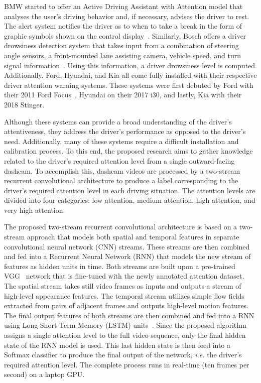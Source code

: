 BMW started to offer an Active Driving Assistant with Attention model that analyses the user's driving behavior and, if necessary, advises the driver to rest. The alert system notifies the driver as to when to take a break in the form of graphic symbols shown on the control display~\cite{bmw}. Similarly, Bosch offers a driver drowsiness detection system that takes input from a combination of steering angle sensors, a front-mounted lane assisting camera, vehicle speed, and turn signal information~\cite{bosch}. Using this information, a driver drowsiness level is computed. Additionally, Ford, Hyundai, and Kia all come fully installed with their respective driver attention warning systems. These systems were first debuted by Ford with their 2011 Ford Focus~\cite{ford}, Hyundai on their 2017 i30, and lastly, Kia with their 2018 Stinger.

Although these systems can provide a broad understanding of the driver's attentiveness, they address the driver's performance as opposed to the driver's need. Additionally, many of these systems require a difficult installation and calibration process. To this end, the proposed research aims to gather knowledge related to the driver's required attention level from a single outward-facing dashcam. To accomplish this, dashcam videos are processed by a two-stream recurrent convolutional architecture to produce a label corresponding to the driver's required attention level in each driving situation. The attention levels are divided into four categories: low attention, medium attention, high attention, and very high attention.

The proposed two-stream recurrent convolutional architecture is based on a two-stream approach that models both spatial and temporal features in separate convolutional neural network (CNN) streams. These streams are then combined and fed into a Recurrent Neural Network (RNN) that models the new stream of features as hidden units in time. Both streams are built upon a pre-trained VGG~\cite{VGGNet:2015} network that is fine-tuned with the newly annotated attention dataset. The spatial stream takes still video frames as inputs and outputs a stream of high-level appearance features. The temporal stream utilizes simple flow fields extracted from pairs of adjacent frames and outputs high-level motion features. The final output features of both streams are then combined and fed into a RNN using Long Short-Term Memory (LSTM) units~\cite{LSTM:1997}. Since the proposed algorithm assigns a single attention level to the full video sequence, only the final hidden state of the RNN model is used. This last hidden state is then feed into a Softmax classifier to produce the final output of the network, \emph{i.e.} the driver's required attention level. The complete process runs in real-time (ten frames per second) on a laptop GPU.

